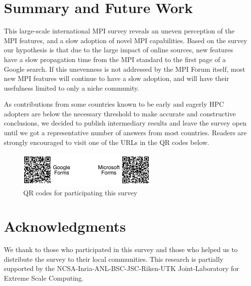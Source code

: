 \documentclass[sigconf,nonacm]{acmart}
\begin{document}
\section{Summary and Future Work}

This large-scale international MPI survey reveals an uneven perception of the
MPI features, and a slow adoption of novel MPI capabilities.
%
Based on the survey our hypothesis is that due to the large impact of online
sources, new features have a slow propagation time from the MPI standard to
the first page of a Google search. If this unevenness is not addressed by the MPI
Forum itself, most new MPI features will continue to have a slow adoption, and
will have their usefulness limited to only a niche community.

As contributions from some countries known to be early and eagerly HPC adopters
are below the necessary threshold to make accurate and constructive
conclusions, we decided to publish intermediary results and leave the
survey open until we got a representative number of answers from most countries.
%
Readers are strongly encouraged to visit one of the URLs in the QR codes below.

\begin{figure}[htb]
\begin{center}
\includegraphics[width=7cm]{figs/QR-codes.pdf}
\vspace{-3mm}
\caption{QR codes for participating this survey}
\label{fig:qrcodes}
\end{center}
\vspace{-5mm}
\end{figure}

\section*{Acknowledgments}
{\small
We thank to those who participated in this survey and those who
helped us to distribute the survey to their local communities.
This research is partially supported by the
NCSA-Inria-ANL-BSC-JSC-Riken-UTK Joint-Laboratory for Extreme Scale
Computing\cite{JLESC}.
}


\end{document}
